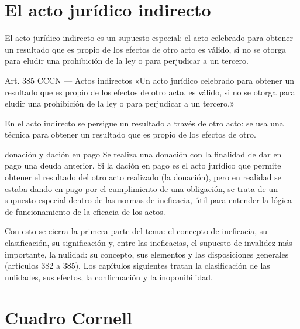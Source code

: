 \documentclass[12pt,oneside]{book}
\begin{document}
\section{El acto jurídico indirecto}

El acto jurídico indirecto es un supuesto especial: el acto celebrado para obtener un resultado que es propio de los efectos de otro acto es válido, si no se otorga para eludir una prohibición de la ley o para perjudicar a un tercero.

\begin{articulo}{Art. 385 CCCN --- Actos indirectos}
«Un acto jurídico celebrado para obtener un resultado que es propio de los efectos de otro acto, es válido, si no se otorga para eludir una prohibición de la ley o para perjudicar a un tercero.»
\end{articulo}

En el acto indirecto se persigue un resultado a través de otro acto: se usa una técnica para obtener un resultado que es propio de los efectos de otro.

\begin{example}{donación y dación en pago}
Se realiza una donación con la finalidad de dar en pago una deuda anterior. Si la dación en pago es el acto jurídico que permite obtener el resultado del otro acto realizado (la donación), pero en realidad se estaba dando en pago por el cumplimiento de una obligación, se trata de un supuesto especial dentro de las normas de ineficacia, útil para entender la lógica de funcionamiento de la eficacia de los actos.
\end{example}

Con esto se cierra la primera parte del tema: el concepto de ineficacia, su clasificación, su significación y, entre las ineficacias, el supuesto de invalidez más importante, la nulidad: su concepto, sus elementos y las disposiciones generales (artículos 382 a 385). Los capítulos siguientes tratan la clasificación de las nulidades, sus efectos, la confirmación y la inoponibilidad.

\clearpage
\section{Cuadro Cornell}
\end{document}
